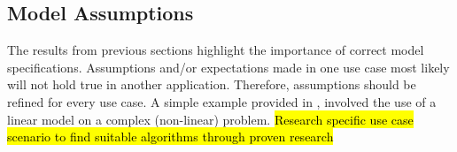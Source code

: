 \subsection{Model Assumptions}
The results from previous sections highlight the importance of correct model specifications. 
Assumptions and/or expectations made in one use case most likely will not hold true in another application.
Therefore, assumptions should be refined for every use case.
A simple example provided in \cite{saria2019tutorial}, involved the use of a linear model on a complex (non-linear) problem.
\hl{Research specific use case scenario to find suitable algorithms through proven research}

